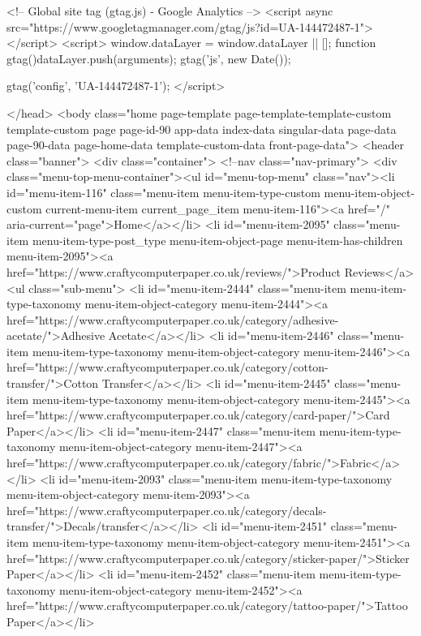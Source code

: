     <!-- Global site tag (gtag.js) - Google Analytics -->
  <script async src="https://www.googletagmanager.com/gtag/js?id=UA-144472487-1"></script>
  <script>
    window.dataLayer = window.dataLayer || [];
    function gtag(){dataLayer.push(arguments);}
    gtag('js', new Date());

    gtag('config', 'UA-144472487-1');
  </script>

</head>
  <body class="home page-template page-template-template-custom template-custom page page-id-90 app-data index-data singular-data page-data page-90-data page-home-data template-custom-data front-page-data">
        <header class="banner">
  <div class="container">
     <!--nav class="nav-primary">
              <div class="menu-top-menu-container"><ul id="menu-top-menu" class="nav"><li id="menu-item-116" class="menu-item menu-item-type-custom menu-item-object-custom current-menu-item current_page_item menu-item-116"><a href="/" aria-current="page">Home</a></li>
<li id="menu-item-2095" class="menu-item menu-item-type-post_type menu-item-object-page menu-item-has-children menu-item-2095"><a href="https://www.craftycomputerpaper.co.uk/reviews/">Product Reviews</a>
<ul class="sub-menu">
	<li id="menu-item-2444" class="menu-item menu-item-type-taxonomy menu-item-object-category menu-item-2444"><a href="https://www.craftycomputerpaper.co.uk/category/adhesive-acetate/">Adhesive Acetate</a></li>
	<li id="menu-item-2446" class="menu-item menu-item-type-taxonomy menu-item-object-category menu-item-2446"><a href="https://www.craftycomputerpaper.co.uk/category/cotton-transfer/">Cotton Transfer</a></li>
	<li id="menu-item-2445" class="menu-item menu-item-type-taxonomy menu-item-object-category menu-item-2445"><a href="https://www.craftycomputerpaper.co.uk/category/card-paper/">Card Paper</a></li>
	<li id="menu-item-2447" class="menu-item menu-item-type-taxonomy menu-item-object-category menu-item-2447"><a href="https://www.craftycomputerpaper.co.uk/category/fabric/">Fabric</a></li>
	<li id="menu-item-2093" class="menu-item menu-item-type-taxonomy menu-item-object-category menu-item-2093"><a href="https://www.craftycomputerpaper.co.uk/category/decals-transfer/">Decals/transfer</a></li>
	<li id="menu-item-2451" class="menu-item menu-item-type-taxonomy menu-item-object-category menu-item-2451"><a href="https://www.craftycomputerpaper.co.uk/category/sticker-paper/">Sticker Paper</a></li>
	<li id="menu-item-2452" class="menu-item menu-item-type-taxonomy menu-item-object-category menu-item-2452"><a href="https://www.craftycomputerpaper.co.uk/category/tattoo-paper/">Tattoo Paper</a></li>
